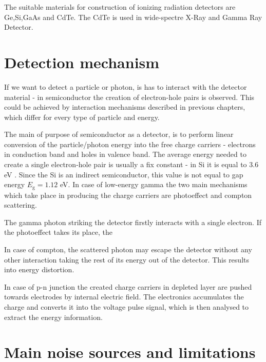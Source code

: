 The suitable materials for construction of ionizing radiation detectors are Ge,Si,GaAs and CdTe. The CdTe is used in wide-spectre X-Ray and Gamma Ray Detector.

\section{Detection mechanism}

\par
If we want to detect a particle or photon, is has to interact with the detector material - in semiconductor the creation of electron-hole pairs is observed. This could be achieved by interaction mechanisms described in previous chapters, which differ for every type of particle and energy. 

\par
The main of purpose of semiconductor as a detector, is to perform linear conversion of the particle/photon energy into the free charge carriers - electrons in conduction band and holes in valence band. The average energy needed to create a single electron-hole pair is usually a fix constant - in Si it is equal to 3.6 eV \cite{Lutz_2007}. Since the Si is an indirect semiconductor, this value is not equal to gap energy $E_{\textrm{g}} = 1.12$ eV. In case of low-energy gamma the two main mechanisms which take place in producing the charge carriers are photoeffect and compton scattering. 

\par
The gamma photon striking the detector firstly interacts with a single electron. If the photoeffect takes its place, the






 In case of compton, the scattered photon may escape the detector without any other interaction taking the rest of its energy out of the detector. This results into energy distortion.  

\par
In case of p-n junction the created charge carriers in depleted layer are pushed towards electrodes by internal electric field. The  electronics accumulates the charge and converts it into the voltage pulse signal, which is then analysed to extract the energy information.

\section{Main noise sources and limitations}

